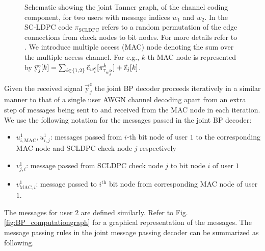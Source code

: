 \begin{figure}[!ht]
  \centering
  \resizebox{0.5\textwidth}{!}{}
    \caption{Schematic showing the joint Tanner graph, of the channel coding component, for two users with message indices $w_1$ and $w_2$. In the SC-LDPC code $\pi_{\text{SCLDPC}}$ refers to a random permutation of the edge connections from  check nodes to bit nodes. For more details refer to \cite{kudekar2011threshold}. We introduce multiple access (MAC) node denoting the sum over the multiple access channel. For e.g., $k$-th MAC node is represented by $\vec{\mathrm{y}}_j^{\mathrm{c}}[k]=\sum_{i\in\{1,2\}}\vec{\mathrm{c}}_{w_i^{\mathrm{c}}}[\pi^k_{\tau_{w_i^\mathrm{p}}}]+\vec{\mathrm{z}}_{j}[k]$.}
	\label{fig:decodergraph}
\end{figure}

Given the received signal $\vec{\mathrm{y}}_j^{\mathrm{c}}$ the joint BP decoder proceeds iteratively in a similar manner to that of a single user AWGN channel decoding apart from an extra step of messages being sent to and received from the MAC node in each iteration. We use the following notation for the messages passed in the joint BP decoder:
\begin{itemize}
\item $u^{1}_{i,\text{MAC}},u^{1}_{i,j}$: messages passed from $i$-th bit node of user $1$ to the corresponding MAC node and  SCLDPC check node $j$ respectively
\item $v^{1}_{j,i}$: message passed from SCLDPC check node $j$ to bit node $i$ of user $1$
\item $v^{1}_{\text{MAC},i}$: message passed to $i^{\text{th}}$ bit node from corresponding MAC node of user $1$.
\end{itemize}
The messages for user $2$ are defined similarly. Refer to Fig. \ref{fig:BP_computationgraph} for a graphical representation of the messages. The message passing rules in the joint message passing decoder can be summarized as following.

